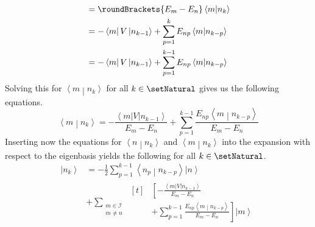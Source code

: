 \documentclass[10pt,fleqn]{article}
\newcommand{\bra}[1]{\left\langle #1 \right\vert}
\newcommand{\ket}[1]{\left\vert #1 \right\rangle}
\newcommand{\bracket}[2]{\left\langle #1 \middle\vert #2 \right\rangle}
\begin{document}
\begin{multicols}{2}
\begin{align*}
        &= \roundBrackets{E_m-E_n}\bracket{m}{n_k} \\
        &= -\bra{m}V\ket{n_{k-1}} + \sum_{p=1}^k E_{np}\bracket{m}{n_{k-p}} \\
        &= -\bra{m}V\ket{n_{k-1}} + \sum_{p=1}^{k-1} E_{np}\bracket{m}{n_{k-p}}
      \end{align*}
      Solving this for $\bracket{m}{n_k}$ for all $k\in\setNatural$ gives us the following equations.
      \[
        \bracket{m}{n_k} = -\frac{\bra{m}V\ket{n_{k-1}}}{E_m-E_n} + \sum_{p=1}^{k-1} \frac{E_{np}\bracket{m}{n_{k-p}}}{E_m - E_n}
      \]
      Inserting now the equations for $\bracket{n}{n_k}$ and $\bracket{m}{n_k}$ into the expansion with respect to the eigenbasis yields the following for all $k\in\setNatural$.
      \begin{align*}
        \ket{n_k} &= -\frac{1}{2}\sum_{p=1}^{k-1} \bracket{n_p}{n_{k-p}}\ket{n} \\
        &+ \sum_{\substack{m\in\mathscr{I}\\m\neq n}}
          \begin{aligned}[t]
            &\left[ -\frac{\bra{m}V\ket{n_{k-1}}}{E_m-E_n} \right. \\
            &\left. + \sum_{p=1}^{k-1} \frac{E_{np}\bracket{m}{n_{k-p}}}{E_m - E_n} \right] \ket{m}
          \end{aligned}
      \end{align*}


\end{multicols}
\end{document}

